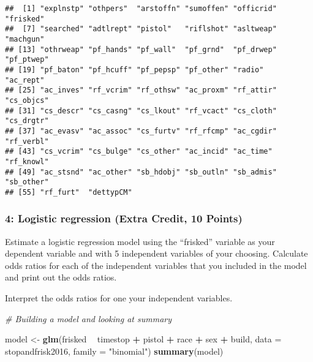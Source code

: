 \documentclass[]{article}
\newenvironment{Shaded}{\begin{snugshade}}{\end{snugshade}}
\newcommand{\CommentTok}[1]{\textcolor[rgb]{0.56,0.35,0.01}{\textit{#1}}}
\newcommand{\DataTypeTok}[1]{\textcolor[rgb]{0.13,0.29,0.53}{#1}}
\newcommand{\KeywordTok}[1]{\textcolor[rgb]{0.13,0.29,0.53}{\textbf{#1}}}
\newcommand{\NormalTok}[1]{#1}
\newcommand{\OperatorTok}[1]{\textcolor[rgb]{0.81,0.36,0.00}{\textbf{#1}}}
\newcommand{\StringTok}[1]{\textcolor[rgb]{0.31,0.60,0.02}{#1}}
\begin{document}
\begin{verbatim}
##  [1] "explnstp" "othpers"  "arstoffn" "sumoffen" "officrid" "frisked" 
##  [7] "searched" "adtlrept" "pistol"   "riflshot" "asltweap" "machgun" 
## [13] "othrweap" "pf_hands" "pf_wall"  "pf_grnd"  "pf_drwep" "pf_ptwep"
## [19] "pf_baton" "pf_hcuff" "pf_pepsp" "pf_other" "radio"    "ac_rept" 
## [25] "ac_inves" "rf_vcrim" "rf_othsw" "ac_proxm" "rf_attir" "cs_objcs"
## [31] "cs_descr" "cs_casng" "cs_lkout" "rf_vcact" "cs_cloth" "cs_drgtr"
## [37] "ac_evasv" "ac_assoc" "cs_furtv" "rf_rfcmp" "ac_cgdir" "rf_verbl"
## [43] "cs_vcrim" "cs_bulge" "cs_other" "ac_incid" "ac_time"  "rf_knowl"
## [49] "ac_stsnd" "ac_other" "sb_hdobj" "sb_outln" "sb_admis" "sb_other"
## [55] "rf_furt"  "dettypCM"
\end{verbatim}

\hypertarget{logistic-regression-extra-credit-10-points}{%
\subsubsection{4: Logistic regression (Extra Credit, 10
Points)}\label{logistic-regression-extra-credit-10-points}}

Estimate a logistic regression model using the ``frisked'' variable as
your dependent variable and with 5 independent variables of your
choosing. Calculate odds ratios for each of the independent variables
that you included in the model and print out the odds ratios.

Interpret the odds ratios for one your independent variables.

\begin{Shaded}
\begin{Highlighting}[]
\CommentTok{# Building a model and looking at summary}

\NormalTok{model <-}\StringTok{ }\KeywordTok{glm}\NormalTok{(frisked }\OperatorTok{~}\StringTok{ }\NormalTok{timestop }\OperatorTok{+}\StringTok{ }\NormalTok{pistol }\OperatorTok{+}\StringTok{ }\NormalTok{race }\OperatorTok{+}\StringTok{ }\NormalTok{sex }\OperatorTok{+}\StringTok{ }\NormalTok{build, }\DataTypeTok{data =}\NormalTok{ stopandfrisk2016, }\DataTypeTok{family =} \StringTok{"binomial"}\NormalTok{)}
\KeywordTok{summary}\NormalTok{(model)}
\end{Highlighting}
\end{Shaded}
\end{document}
